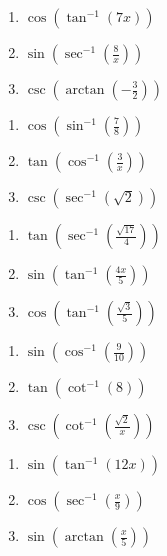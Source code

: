 \smallskip
\begin{multicols}{3}
\begin{enumerate}	\setcounter{enumi}{\value{Review}}
	\item $\cos\left(\tan^{-1}(7x)\right)$
	\item $\sin\left(\sec^{-1}\left(\frac{8}{x}\right)\right)$
	\item $\csc\left(\arctan\left(-\frac{3}{2}\right)\right)$
\end{enumerate}	\setcounter{Review}{\value{enumi}}
\end{multicols}
\smallskip
\begin{multicols}{3}
\begin{enumerate}	\setcounter{enumi}{\value{Review}}
	\item $\cos\left(\sin^{-1}\left(\frac{7}{8}\right)\right)$
	\item $\tan\left(\cos^{-1}\left(\frac{3}{x}\right)\right)$
	\item $\csc\left(\sec^{-1}\left(\sqrt{2}\right)\right)$
\end{enumerate}	\setcounter{Review}{\value{enumi}}
\end{multicols}
\smallskip
\begin{multicols}{3}
\begin{enumerate}	\setcounter{enumi}{\value{Review}}
	\item $\tan\left(\sec^{-1}\left(\frac{\sqrt{17}}{4}\right)\right)$
	\item $\sin\left(\tan^{-1}\left(\frac{4x}{5}\right)\right)$
	\item $\cos\left(\tan^{-1}\left(\frac{\sqrt{3}}{5}\right)\right)$
\end{enumerate}	\setcounter{Review}{\value{enumi}}
\end{multicols}
\smallskip
\begin{multicols}{3}
\begin{enumerate}	\setcounter{enumi}{\value{Review}}
	\item $\sin\left(\cos^{-1}\left(\frac{9}{10}\right)\right)$
	\item $\tan\left(\cot^{-1}\left(8\right)\right)$
	\item $\csc\left(\cot^{-1}\left(\frac{\sqrt{2}}{x}\right)\right)$
\end{enumerate}	\setcounter{Review}{\value{enumi}}
\end{multicols}
\smallskip
\begin{multicols}{3}
\begin{enumerate}	\setcounter{enumi}{\value{Review}}
	\item $\sin\left(\tan^{-1}(12x)\right)$
	\item $\cos\left(\sec^{-1}\left(\frac{x}{9}\right)\right)$
	\item $\sin\left(\arctan\left(\frac{x}{5}\right)\right)$
\end{enumerate}	\setcounter{Review}{\value{enumi}}
\end{multicols}
